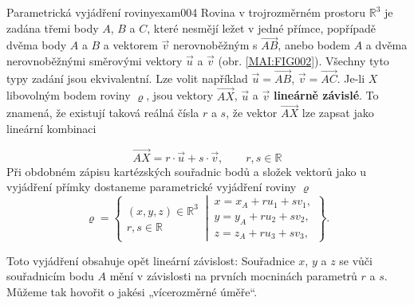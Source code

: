 \begin{mathexam}{Parametrická vyjádření roviny}{exam004}
  Rovina v trojrozměrném prostoru \(\mathbb{R}^3\) je zadána třemi body \(A\), \(B\) a \(C\), které
  nesmějí ležet v jedné přímce, popřípadě dvěma body \(A\) a \(B\) a vektorem \(\vec{v}\)
  nerovnoběžným s \(\overrightarrow{AB}\), anebo bodem \(A\) a dvěma nerovnoběžnými směrovými
  vektory \(\vec{u}\) a \(\vec{v}\) (obr. \ref{MAI:FIG002}). Všechny tyto typy zadání jsou
  ekvivalentní. Lze volit například \(\vec{u} = \overrightarrow{AB}\), \(\vec{v} =
  \overrightarrow{AC}\). Je-li \(X\) libovolným bodem roviny \(\varrho\), jsou vektory
  \(\overrightarrow{AX}\), \(\vec{u}\) a \(\vec{v}\) \textbf{lineárně závislé}. To znamená, že
  existují taková reálná čísla \(r\) a \(s\), že vektor \(\overrightarrow{AX}\) lze zapsat jako
  lineární kombinaci

  \begin{equation*}
    \overrightarrow{AX} = r\cdot\vec{u} + s\cdot\vec{v}, \qquad r,s \in\mathbb{R}
  \end{equation*}
  Při obdobném zápisu kartézských souřadnic bodů a složek vektorů jako u vyjádření přímky dostaneme
  parametrické vyjádření roviny \(\varrho\)
  \begin{equation*}
    \varrho = \left\{
    \begin{matrix}  
      (x,y,z)\in\mathbb{R}^3  \\
      r, s \in\mathbb{R}
    \end{matrix}
    \,\left\lvert\,
    \begin{matrix}
      x = x_A + ru_1 + sv_1,        \\
      y = y_A + ru_2 + sv_2,        \\
      z = z_A + ru_3 + sv_3,
    \end{matrix}\right.          
    \right\}.
  \end{equation*}

  { \centering
    \captionsetup{type=figure}
     \par}

  Toto vyjádření obsahuje opět lineární závislost: Souřadnice \(x\), \(y\) a \(z\) se vůči
  souřadnicím bodu \(A\) mění v závislosti na prvních mocninách parametrů \(r\) a \(s\). Můžeme tak
  hovořit o jakési „vícerozměrné úměře“.
\end{mathexam}
  